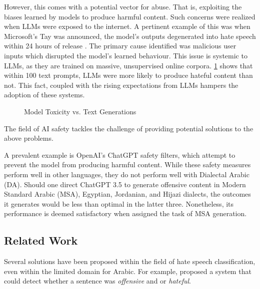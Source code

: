 \documentclass[10pt,twocolumn,letterpaper]{article}
\begin{document}
However, this comes with a potential vector for abuse.
That is, exploiting the biases learned by models to produce harmful content.
Such concerns were realized when LLMs were exposed to the internet.
A pertinent example of this was when Microsoft's Tay was announced, the model's outputs degenerated into hate speech within 24 hours of release \cite{wolfWhyWeShould2017}.
The primary cause identified was malicious user inputs which disrupted the model's learned behaviour.
This issue is systemic to LLMs, as they are trained on massive, unsupervised online corpora. 
\cref{fig:llm-toxcity} shows that within 100 text prompts, LLMs were more likely to produce hateful content than not.
This fact, coupled with the rising expectations from LLMs hampers the adoption of these systems.

\begin{figure}[h]
    \centering
    
    \caption{Model Toxicity vs. Text Generations \cite{gehmanRealToxicityPromptsEvaluatingNeural2020}}
    \label{fig:llm-toxcity}
\end{figure}

The field of AI safety tackles the challenge of providing potential solutions to the above problems. 

A prevalent example is OpenAI's ChatGPT safety filters, which attempt to prevent the model from producing harmful content.
While these safety measures perform well in other languages, they do not perform well with Dialectal Arabic (DA).
Should one direct ChatGPT 3.5 to generate offensive content in Modern Standard Arabic (MSA), Egyptian, Jordanian, and Hijazi dialects, the outcomes it generates would be less than optimal in the latter three. Nonetheless, its performance is deemed satisfactory when assigned the task of MSA generation.

\subsection{Related Work}

Several solutions have been proposed within the field of hate speech classification, even within the limited domain for Arabic. For example, \cite{shapiroAlexUAICArabicHate2022} proposed a system that could detect whether a sentence was \emph{offensive} and or \emph{hateful}.
\end{document}
